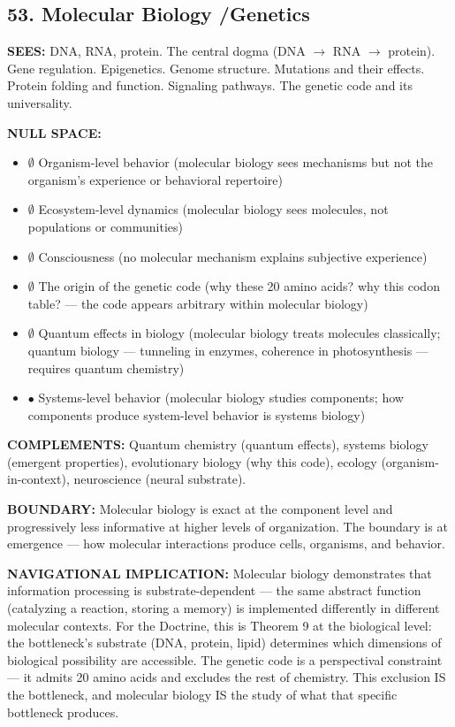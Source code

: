 \subsection*{53. Molecular Biology /\allowbreak  Genetics}


\textbf{SEES:} DNA, RNA, protein. The central dogma (DNA $\rightarrow$ RNA $\rightarrow$ protein). Gene regulation. Epigenetics. Genome structure. Mutations and their effects. Protein folding and function. Signaling pathways. The genetic code and its universality.


\textbf{NULL SPACE:}

\begin{itemize}[nosep,leftmargin=*]
  \item $\emptyset$ Organism-level behavior (molecular biology sees mechanisms but not the organism's experience or behavioral repertoire)
  \item $\emptyset$ Ecosystem-level dynamics (molecular biology sees molecules, not populations or communities)
  \item $\emptyset$ Consciousness (no molecular mechanism explains subjective experience)
  \item $\emptyset$ The origin of the genetic code (why these 20 amino acids? why this codon table? — the code appears arbitrary within molecular biology)
  \item $\emptyset$ Quantum effects in biology (molecular biology treats molecules classically; quantum biology — tunneling in enzymes, coherence in photosynthesis — requires quantum chemistry)
  \item $\bullet$ Systems-level behavior (molecular biology studies components; how components produce system-level behavior is systems biology)
\end{itemize}


\textbf{COMPLEMENTS:} Quantum chemistry (quantum effects), systems biology (emergent properties), evolutionary biology (why this code), ecology (organism-in-context), neuroscience (neural substrate).


\textbf{BOUNDARY:} Molecular biology is exact at the component level and progressively less informative at higher levels of organization. The boundary is at emergence — how molecular interactions produce cells, organisms, and behavior.


\textbf{NAVIGATIONAL IMPLICATION:} Molecular biology demonstrates that information processing is substrate-dependent — the same abstract function (catalyzing a reaction, storing a memory) is implemented differently in different molecular contexts. For the Doctrine, this is Theorem 9 at the biological level: the bottleneck's substrate (DNA, protein, lipid) determines which dimensions of biological possibility are accessible. The genetic code is a perspectival constraint — it admits 20 amino acids and excludes the rest of chemistry. This exclusion IS the bottleneck, and molecular biology IS the study of what that specific bottleneck produces.


